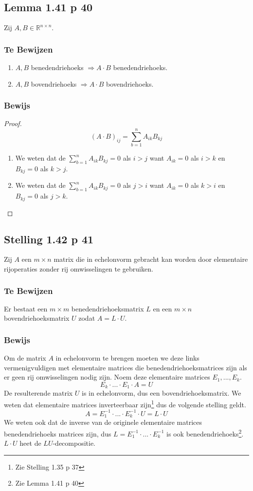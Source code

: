 \documentclass[lineaire_algebra_oplossingen.tex]{subfiles}
\begin{document}
\subsection{Lemma 1.41 p 40}
\label{1.41}
Zij $A,B \in \mathbb{R}^{n\times n}$.

\subsubsection*{Te Bewijzen}
\begin{enumerate}
\item $A,B$ benedendriehoeks $\Rightarrow A\cdot B$ benedendriehoeks.
\item $A,B$ bovendriehoeks $\Rightarrow A\cdot B$ bovendriehoeks.
\end{enumerate}

\subsubsection*{Bewijs}
\begin{proof}
\[
(A\cdot B)_{ij} = \sum_{b=1}^nA_{ik}B_{kj} 
\]
\begin{enumerate}
\item We weten dat de  $\sum_{b=1}^nA_{ik}B_{kj} = 0$ als $i>j$ want $A_{ik} = 0$ als $i>k$ en $B_{kj}=0$ als $k>j$.
\item We weten dat de  $\sum_{b=1}^nA_{ik}B_{kj} = 0$ als $j>i$ want $A_{ik} = 0$ als $k>i$ en $B_{kj}=0$ als $j>k$.
\end{enumerate}
\end{proof}


\subsection{Stelling 1.42 p 41}
\label{1.42}
Zij $A$ een $m\times n$ matrix die in echelonvorm gebracht kan worden door elementaire rijoperaties zonder rij omwisselingen te gebruiken.

\subsubsection*{Te Bewijzen}
Er bestaat een $m\times m$ benedendriehoeksmatrix $L$ en een $m\times n$ bovendriehoeksmatrix $U$ zodat $A = L\cdot U$.

\subsubsection*{Bewijs}
Om de matrix $A$ in echelonvorm te brengen moeten we deze links vermenigvuldigen met elementaire matrices die benedendriehoeksmatrices zijn als er geen rij omwisselingen nodig zijn. Noem deze elementaire matrices $E_1,...,E_k$.
\[
E_k\cdot ... \cdot E_1 \cdot A = U
\]
De resulterende matrix $U$ is in echelonvorm, dus een bovendriehoeksmatrix. We weten dat elementaire matrices inverteerbaar zijn\footnote{Zie Stelling 1.35 p 37} dus de volgende stelling geldt.
\[
A = E_1^{-1}\cdot ...\cdot E_k^{-1} \cdot U = L\cdot U
\]
We weten ook dat de inverse van de originele elementaire matrices benedendriehoeks matrices zijn, dus $L = E_1^{-1}\cdot ...\cdot E_k^{-1}$ is ook benedendriehoeks\footnote{Zie Lemma 1.41 p 40}.
$L\cdot U$ heet de $LU$-decompositie.
\end{document}
